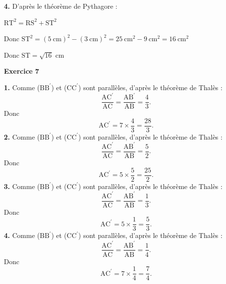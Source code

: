 \documentclass[12pt,a4paper,french]{article}
\begin{document}
\medskip
\textbf{4.} D'après le théorème de Pythagore :

$\ensuremath{\mathrm{R}}\ensuremath{\mathrm{T}}^2 = \ensuremath{\mathrm{R}}\ensuremath{\mathrm{S}}^2 + \ensuremath{\mathrm{S}}\ensuremath{\mathrm{T}}^2$

Donc $\ensuremath{\mathrm{S}}\ensuremath{\mathrm{T}}^2 = (5~\text{cm})^2 - (3~\text{cm})^2 = 25~\text{cm}^2 - 9~\text{cm}^2 = 16~\text{cm}^2$

Donc $\ensuremath{\mathrm{S}}\ensuremath{\mathrm{T}} = \sqrt{16}$ cm

\medskip
\medskip

\noindent\textbf{Exercice 7}\par
\smallskip
\textbf{1.} Comme (\ensuremath{\mathrm{B}}\ensuremath{\mathrm{B}^\prime}) et (\ensuremath{\mathrm{C}}\ensuremath{\mathrm{C}^\prime}) sont parallèles, d'après le théorème de Thalès : \[\dfrac{\ensuremath{\mathrm{A}}\ensuremath{\mathrm{C}^\prime}}{\ensuremath{\mathrm{A}}\ensuremath{\mathrm{C}}}=\dfrac{\ensuremath{\mathrm{A}}\ensuremath{\mathrm{B}^\prime}}{\ensuremath{\mathrm{A}}\ensuremath{\mathrm{B}}}=\dfrac{4}{3}.\]Donc \[\ensuremath{\mathrm{A}}\ensuremath{\mathrm{C}^\prime}=7\times\dfrac{4}{3}=\dfrac{28}{3}.\]\medskip
\textbf{2.} Comme (\ensuremath{\mathrm{B}}\ensuremath{\mathrm{B}^\prime}) et (\ensuremath{\mathrm{C}}\ensuremath{\mathrm{C}^\prime}) sont parallèles, d'après le théorème de Thalès : \[\dfrac{\ensuremath{\mathrm{A}}\ensuremath{\mathrm{C}^\prime}}{\ensuremath{\mathrm{A}}\ensuremath{\mathrm{C}}}=\dfrac{\ensuremath{\mathrm{A}}\ensuremath{\mathrm{B}^\prime}}{\ensuremath{\mathrm{A}}\ensuremath{\mathrm{B}}}=\dfrac{5}{2}.\]Donc \[\ensuremath{\mathrm{A}}\ensuremath{\mathrm{C}^\prime}=5\times\dfrac{5}{2}=\dfrac{25}{2}.\]\medskip
\textbf{3.} Comme (\ensuremath{\mathrm{B}}\ensuremath{\mathrm{B}^\prime}) et (\ensuremath{\mathrm{C}}\ensuremath{\mathrm{C}^\prime}) sont parallèles, d'après le théorème de Thalès : \[\dfrac{\ensuremath{\mathrm{A}}\ensuremath{\mathrm{C}^\prime}}{\ensuremath{\mathrm{A}}\ensuremath{\mathrm{C}}}=\dfrac{\ensuremath{\mathrm{A}}\ensuremath{\mathrm{B}^\prime}}{\ensuremath{\mathrm{A}}\ensuremath{\mathrm{B}}}=\dfrac{1}{3}.\]Donc \[\ensuremath{\mathrm{A}}\ensuremath{\mathrm{C}^\prime}=5\times\dfrac{1}{3}=\dfrac{5}{3}.\]\medskip
\textbf{4.} Comme (\ensuremath{\mathrm{B}}\ensuremath{\mathrm{B}^\prime}) et (\ensuremath{\mathrm{C}}\ensuremath{\mathrm{C}^\prime}) sont parallèles, d'après le théorème de Thalès : \[\dfrac{\ensuremath{\mathrm{A}}\ensuremath{\mathrm{C}^\prime}}{\ensuremath{\mathrm{A}}\ensuremath{\mathrm{C}}}=\dfrac{\ensuremath{\mathrm{A}}\ensuremath{\mathrm{B}^\prime}}{\ensuremath{\mathrm{A}}\ensuremath{\mathrm{B}}}=\dfrac{1}{4}.\]Donc \[\ensuremath{\mathrm{A}}\ensuremath{\mathrm{C}^\prime}=7\times\dfrac{1}{4}=\dfrac{7}{4}.\]\medskip
\medskip
\end{document}
